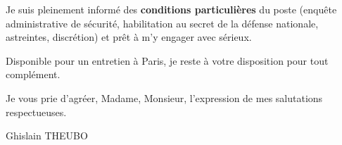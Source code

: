 \documentclass[11pt,a4paper]{article}
\begin{document}
\noindent Je suis pleinement inform\'e des \textbf{conditions particuli\`eres} du poste (enqu\^ete administrative de s\'ecurit\'e, habilitation au secret de la d\'efense nationale, astreintes, discr\'etion) et pr\^et \`a m'y engager avec s\'erieux.

\vspace{0.5em}
\noindent Disponible pour un entretien \`a Paris, je reste \`a votre disposition pour tout compl\'ement.

\vspace{0.8em}
\noindent Je vous prie d'agr\'eer, Madame, Monsieur, l'expression de mes salutations respectueuses.

\vspace{1.5em}
\noindent Ghislain THEUBO
\end{document}
